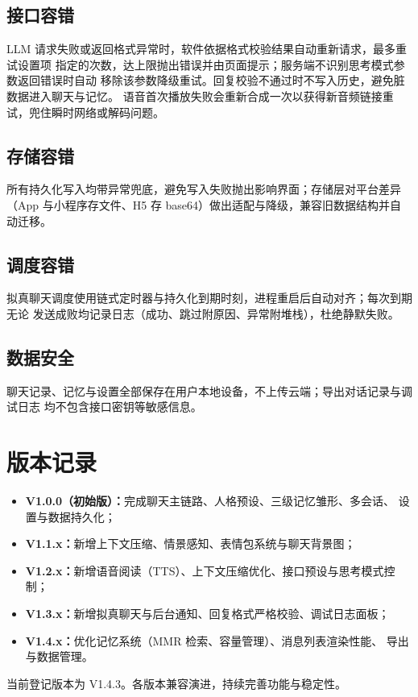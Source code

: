 \documentclass[zihao=5,a4paper]{ctexart}
\begin{document}
\subsection{接口容错}
LLM 请求失败或返回格式异常时，软件依据格式校验结果自动重新请求，最多重试设置项
指定的次数，达上限抛出错误并由页面提示；服务端不识别思考模式参数返回错误时自动
移除该参数降级重试。回复校验不通过时不写入历史，避免脏数据进入聊天与记忆。
语音首次播放失败会重新合成一次以获得新音频链接重试，兜住瞬时网络或解码问题。

\subsection{存储容错}
所有持久化写入均带异常兜底，避免写入失败抛出影响界面；存储层对平台差异
（App 与小程序存文件、H5 存 base64）做出适配与降级，兼容旧数据结构并自动迁移。

\subsection{调度容错}
拟真聊天调度使用链式定时器与持久化到期时刻，进程重启后自动对齐；每次到期无论
发送成败均记录日志（成功、跳过附原因、异常附堆栈），杜绝静默失败。

\subsection{数据安全}
聊天记录、记忆与设置全部保存在用户本地设备，不上传云端；导出对话记录与调试日志
均不包含接口密钥等敏感信息。

\section{版本记录}
\begin{itemize}[itemsep=0pt,parsep=0pt]
  \item \textbf{V1.0.0（初始版）：}完成聊天主链路、人格预设、三级记忆雏形、多会话、
        设置与数据持久化；
  \item \textbf{V1.1.x：}新增上下文压缩、情景感知、表情包系统与聊天背景图；
  \item \textbf{V1.2.x：}新增语音阅读（TTS）、上下文压缩优化、接口预设与思考模式控制；
  \item \textbf{V1.3.x：}新增拟真聊天与后台通知、回复格式严格校验、调试日志面板；
  \item \textbf{V1.4.x：}优化记忆系统（MMR 检索、容量管理）、消息列表渲染性能、
        导出与数据管理。
\end{itemize}
当前登记版本为 V1.4.3。各版本兼容演进，持续完善功能与稳定性。
\end{document}
